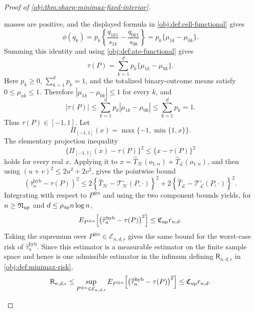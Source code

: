 \documentclass[11pt]{article}
\begin{document}
\begin{proof}[Proof of \cref{obj:thm:sharp-minimax-fixed-interior}]
\begin{enumerate}
masses are positive, and the displayed formula in \cref{obj:def:cell-functional} gives
\[
\phi(q_k)
=
p_k\left\{\frac{q_{1k1}}{s_{1k}}-\frac{q_{0k1}}{s_{0k}}\right\}
=
p_k\{\mu_{1k}-\mu_{0k}\}.
\]
Summing this identity and using \cref{obj:def:ate-functional} gives
\[
\tau(P)=\sum_{k=1}^d p_k\{\mu_{1k}-\mu_{0k}\}.
\]
Here \(p_k\ge0\), \(\sum_{k=1}^d p_k=1\), and the totalized binary-outcome means satisfy
\(0\le\mu_{ak}\le1\).  Therefore \(|\mu_{1k}-\mu_{0k}|\le1\) for every \(k\), and
\[
|\tau(P)|
\le
\sum_{k=1}^d p_k |\mu_{1k}-\mu_{0k}|
\le
\sum_{k=1}^d p_k
=1.
\]
Thus \(\tau(P)\in[-1,1]\).  Let
\[
\Pi_{[-1,1]}(x)=\max\{-1,\min\{1,x\}\}.
\]
The elementary projection inequality
\[
\{\Pi_{[-1,1]}(x)-\tau(P)\}^2\le \{x-\tau(P)\}^2
\]
holds for every real \(x\).  Applying it to
\(x=\widehat T_{\mathcal H}(o_{1:n})+\widehat T_{\mathcal L}(o_{1:n})\), and then using
\((u+v)^2\le2u^2+2v^2\), gives the pointwise bound
\[
\left(\widehat\tau_n^{\mathrm{hyb}}-\tau(P)\right)^2
\le
2\left\{\widehat T_{\mathcal H}-\mathcal T_{\mathcal H}^{\circ}(P,\cdot)\right\}^2
+
2\left\{\widehat T_{\mathcal L}-\mathcal T_{\mathcal L}^{\circ}(P,\cdot)\right\}^2 .
\]
Integrating with respect to \(P^{\otimes n}\) and using the two component bounds yields, for
\(n\ge\mathfrak N_{\rm up}\) and
\(d\le\mathfrak\rho_{\rm up}n\log n\),
\[
E_{P^{\otimes n}}\!\left[
\left(\widehat\tau_n^{\mathrm{hyb}}-\tau(P)\right)^2
\right]
\le
\mathfrak C_{\rm up} r_{n,d}.
\]
Taking the supremum over \(P^{\otimes n}\in\mathcal E_{n,d,\epsilon}\) gives the same bound
for the worst-case risk of \(\widehat\tau_n^{\mathrm{hyb}}\).  Since this estimator is a
measurable estimator on the finite sample space and hence is one admissible estimator in the
infimum defining \(\mathsf R_{n,d,\epsilon}\) in \cref{obj:def:minimax-risk},
\[
\mathsf R_{n,d,\epsilon}
\le
\sup_{P^{\otimes n}\in\mathcal E_{n,d,\epsilon}}
E_{P^{\otimes n}}\!\left[
\left(\widehat\tau_n^{\mathrm{hyb}}-\tau(P)\right)^2
\right]
\le
\mathfrak C_{\rm up} r_{n,d}.
\]


\end{enumerate}
\end{proof}
\end{document}
